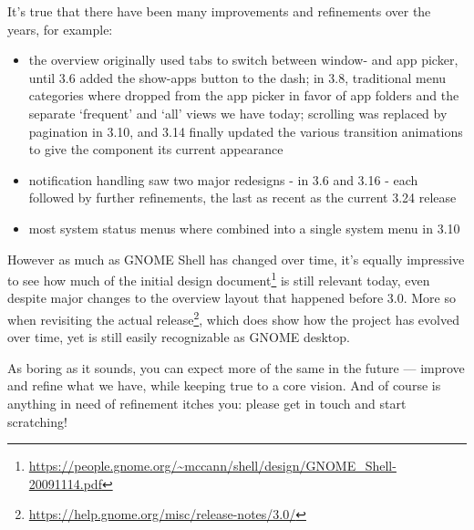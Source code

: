 \documentclass[10pt, a5paper]{article}
\begin{document}
\begin{Parallel}[p]{}{}
{\a It's true that there have been many improvements and refinements over the years, for example:
\begin{itemize}
\item the overview originally used tabs to switch between window- and
   app picker, until 3.6 added the show-apps button to the dash; in
   3.8, traditional menu categories where dropped from the app picker
   in favor of app folders and the separate ‘frequent’ and ‘all’ views
   we have today; scrolling was replaced by pagination in 3.10, and 3.14
   finally updated the various transition animations to give the component
   its current appearance

\item notification handling saw two major redesigns - in 3.6 and 3.16 - each
   followed by further refinements, the last as recent as the current 3.24
   release

\item most system status menus where combined into a single system menu in 3.10
\end{itemize}

However as much as GNOME Shell has changed over time, it's equally impressive to see how much of the initial design document\footnote{\url{https://people.gnome.org/~mccann/shell/design/GNOME\_Shell-20091114.pdf}} is still relevant today, even despite major changes to the overview layout that happened before 3.0. More so when revisiting the actual release\footnote{\url{https://help.gnome.org/misc/release-notes/3.0/}}, which does show how the project has evolved over time, yet is still easily recognizable as GNOME desktop.

As boring as it sounds, you can expect more of the same in the future --- improve and refine what we have, while keeping true to a core vision. And of course is anything in need of refinement itches you: please get in touch and start scratching!


\vfill
     }
\end{Parallel}
\end{document}
